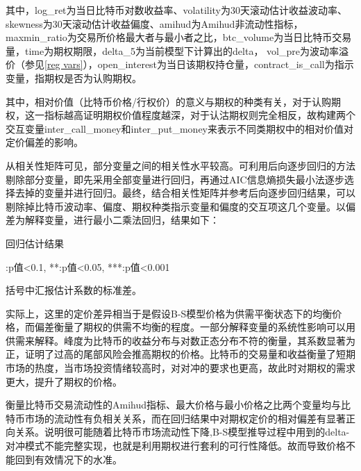     \newpage
\restoregeometry
其中，log\_ret为当日比特币对数收益率、volatility为30天滚动估计收益波动率、skewness为30天滚动估计收益偏度、amihud为Amihud非流动性指标，maxmin\_ratio为交易所价格最大者与最小者之比，btc\_volume为当日比特币交易量，time为期权期限，delta\_5为当前模型下计算出的delta，
vol\_pre为波动率溢价（参见\ref{reg vars}），open\_interest为当日该期权持仓量，contract\_is\_call为指示变量，指期权是否为认购期权。
\par{其中，相对价值（比特币价格/行权价）的意义与期权的种类有关，对于认购期权，这一指标越高证明期权价值程度越深，对于认沽期权则完全相反，故构建两个交互变量inter\_call\_money和inter\_put\_money来表示不同类期权中的相对价值对定价偏差的影响。}
\par{从相关性矩阵可见，部分变量之间的相关性水平较高。可利用后向逐步回归的方法剔除部分变量，即先采用全部变量进行回归，再通过AIC信息熵损失最小法逐步选择去掉的变量并进行回归。最终，结合相关性矩阵并参考后向逐步回归结果，可以剔除掉比特币波动率、偏度、期权种类指示变量和偏度的交互项这几个变量。以偏差为解释变量，进行最小二乘法回归，结果如下：}
\newpage
{}
\begin{center}
    \begin{threeparttable}[H]

        \caption{回归估计结果}
        
        
        \begin{tablenotes}
            \footnotesize
            \item *:p值<0.1, **:p值<0.05, ***:p值<0.001
            \item 括号中汇报估计系数的标准差。
        \end{tablenotes}
    \end{threeparttable}
\end{center}
\newpage
\restoregeometry
\par{
实际上，这里的定价差异相当于是假设B-S模型价格为供需平衡状态下的均衡价格，而偏差衡量了期权的供需不均衡的程度。一部分解释变量的系统性影响可以用供需来解释。峰度为比特币的收益分布与对数正态分布不符的衡量，其系数显著为正，证明了过高的尾部风险会推高期权的价格。比特币的交易量和收益衡量了短期市场的热度，当市场投资情绪较高时，对对冲的要求也更高，故此时对期权的需求更大，提升了期权的价格。}
\par{衡量比特币交易流动性的Amihud指标、最大价格与最小价格之比两个变量均与比特币市场的流动性有负相关关系，而在回归结果中对期权定价的相对偏差有显著正向关系。说明很可能随着比特币市场流动性下降,B-S模型推导过程中用到的delta-对冲模式不能完整实现，也就是利用期权进行套利的可行性降低。故而导致价格不能回到有效情况下的水准。
}
